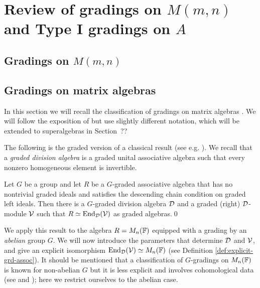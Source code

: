 \chapter{Review of gradings on $M(m,n)$ and Type I gradings on $A$}\label{chap:A-type-I}

\section{Gradings on $M(m,n)$}\label{sec:Mmn}

\section{Gradings on matrix algebras}
\label{sec:gradings-on-matrix-algebras}

In this section we will recall the classification of gradings on matrix algebras \cite{BSZ01, BZ02, BK10}. We will follow the exposition of \cite[Chapter 2]{livromicha} but use slightly different notation, which will be extended to superalgebras in Section~??%

The following is the graded version of a classical result (see e.g. \cite[Theorem 2.6]{livromicha}). 
We recall that a \emph{graded division algebra} is a graded unital associative algebra such that every nonzero homogeneous element is invertible.

\begin{thm}\label{thm:End-over-D}
	Let $G$ be a group and let $R$ be a $G$-graded associative algebra that has no nontrivial graded ideals and satisfies the descending chain condition on 
	graded left ideals. Then there is a $G$-graded division algebra $\mathcal{D}$ and a graded (right) $\mathcal{D}$-module $\mathcal V$ such that $R \simeq \operatorname{End}_{\mathcal{D}} (\mathcal V)$ as graded algebras.\qed
\end{thm}

We apply this result to the algebra $R=M_n(\mathbb{F})$ equipped with a grading by an \emph{abelian} group $G$. We will now introduce the parameters that determine 
$\mathcal D$ and $\mathcal V$, and give an explicit isomorphism $\operatorname{End}_{\mathcal{D}} (\mathcal V)\simeq M_n(\mathbb{F})$ (see Definition \ref{def:explicit-grd-assoc}). It should be mentioned that a classification of $G$-gradings on $M_n(\mathbb{F})$ is known for non-abelian $G$ but it is less explicit and involves cohomological data (see \cite[Corollary 2.22]{livromicha} and \cite[Theorem 1.3]{GS}); here we restrict ourselves to the abelian case.

